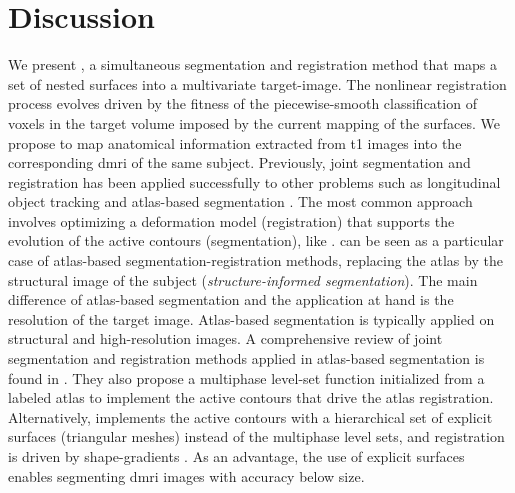 \section{Discussion}
\label{sec:regseg-discussion}
We present \regseg{}, a simultaneous segmentation and registration method that
  maps a set of nested surfaces into a multivariate target-image.
The nonlinear registration process evolves driven by the fitness of the
  piecewise-smooth classification of voxels in the target volume imposed
  by the current mapping of the surfaces.
We propose \regseg{} to map anatomical information extracted from \gls*{t1}
  images into the corresponding \gls*{dmri} of the same subject.
Previously, joint segmentation and registration has been applied successfully to
  other problems such as longitudinal object tracking \citep{paragios_level_2003}
  and atlas-based segmentation \citep{gorthi_active_2011}.
The most common approach involves optimizing a deformation model (registration)
  that supports the evolution of the active contours (segmentation),
  like \cite{paragios_level_2003,yezzi_variational_2003}.
\Regseg{} can be seen as a particular case of atlas-based segmentation-registration methods,
  replacing the atlas by the structural image of the subject (\emph{structure-informed segmentation}).
The main difference of atlas-based segmentation and the application at hand is the resolution of the
  target image.
Atlas-based segmentation is typically applied on structural and high-resolution images.
A comprehensive review of joint segmentation and registration methods applied in atlas-based
  segmentation is found in \citep{gorthi_active_2011}.
They also propose a multiphase level-set function initialized from a labeled atlas to implement
  the active contours that drive the atlas registration.
Alternatively, \regseg{} implements the active contours with a hierarchical set of explicit
  surfaces (triangular meshes) instead of the multiphase level sets, and registration
  is driven by shape-gradients \citep{herbulot_segmentation_2006}.
As an advantage, the use of explicit surfaces enables segmenting \gls*{dmri} images
  with accuracy below  size.

